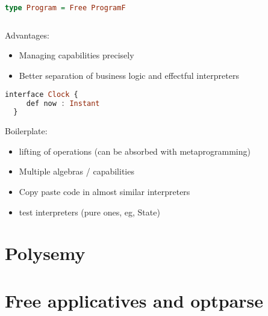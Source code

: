 \documentclass[10pt]{beamer}
\begin{document}
\begin{frame}[fragile]
  \begin{lstlisting}[language=haskell]
  type Program = Free ProgramF
  \end{lstlisting}
\end{frame}

\begin{frame}[fragile]
  \begin{lstlisting}[language=haskell]
  \end{lstlisting}
\end{frame}

\begin{frame}[fragile]
  Advantages:
  \begin{itemize}
    \item Managing capabilities precisely
    \item Better separation of business logic and effectful interpreters
  \end{itemize}
\end{frame}


\begin{frame}[fragile]
  \begin{lstlisting}[language=haskell]
  interface Clock {
     def now : Instant 
  }   
  \end{lstlisting}
\end{frame}

\begin{frame}[fragile]
  Boilerplate:
  \begin{itemize}
    \item lifting of operations (can be absorbed with metaprogramming) 
    \item Multiple algebras / capabilities
    \item Copy paste code in almost similar interpreters 
    \item test interpreters (pure ones, eg, State) 
  \end{itemize}
\end{frame}

\section{Polysemy}
\section{Free applicatives and optparse}


% 
% 
\end{document}
